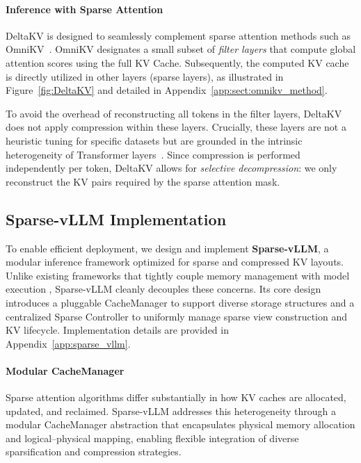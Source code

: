 \paragraph{Inference with Sparse Attention}
DeltaKV is designed to seamlessly complement sparse attention methods such as OmniKV~\cite{hao2025omnikv}. 
OmniKV designates a small subset of \textit{filter layers} that compute global attention scores using the full KV Cache. 
Subsequently, the computed KV cache is directly utilized in other layers (sparse layers), as illustrated in Figure~\ref{fig:DeltaKV} and detailed in Appendix~\ref{app:sect:omnikv_method}. 

To avoid the overhead of reconstructing all tokens in the filter layers, DeltaKV does not apply compression within these layers. Crucially, these layers are not a heuristic tuning for specific datasets but are grounded in the intrinsic heterogeneity of Transformer layers~\cite{hao2025omnikv}. Since compression is performed independently per token, DeltaKV allows for \emph{selective decompression}: we only reconstruct the KV pairs required by the sparse attention mask.



\subsection{Sparse-vLLM Implementation}
\label{sec:method:sparse-vLLM}

To enable efficient deployment, we design and implement \textbf{Sparse-vLLM}, a modular inference framework optimized for sparse and compressed KV layouts.
Unlike existing frameworks that tightly couple memory management with model execution \cite{kwon2023efficient_vllm, zheng2024sglang}, Sparse-vLLM cleanly decouples these concerns.
Its core design introduces a pluggable CacheManager to support diverse storage structures and a centralized Sparse Controller to uniformly manage sparse view construction and KV lifecycle. Implementation details are provided in Appendix~\ref{app:sparse_vllm}.

\paragraph{Modular CacheManager} 
Sparse attention algorithms differ substantially in how KV caches are allocated, updated, and reclaimed. 
Sparse-vLLM addresses this heterogeneity through a modular CacheManager abstraction that encapsulates physical memory allocation and logical–physical mapping, enabling flexible integration of diverse sparsification and compression strategies.

